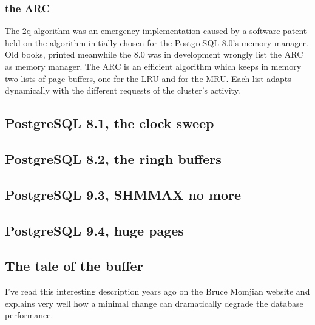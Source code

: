\subsubsection{the ARC}
The 2q algorithm was an emergency implementation caused by a software patent held on the algorithm initially 
chosen for the PostgreSQL 8.0's memory manager. Old books, printed meanwhile the 8.0 was in development 
wrongly list the ARC as memory manager. The ARC is an efficient algorithm which keeps in memory two 
lists of page buffers, one for the LRU and for the MRU. Each list adapts dynamically with the different requests 
of the cluster's activity. 

\subsection{PostgreSQL 8.1, the clock sweep}

\subsection{PostgreSQL 8.2, the ringh buffers}

\subsection{PostgreSQL 9.3, SHMMAX no more}

\subsection{PostgreSQL 9.4, huge pages}

\subsection{The tale of the buffer}
I've read this interesting description years ago on the Bruce Momjian website and explains very well how a 
minimal change can dramatically degrade the database performance.\newline

